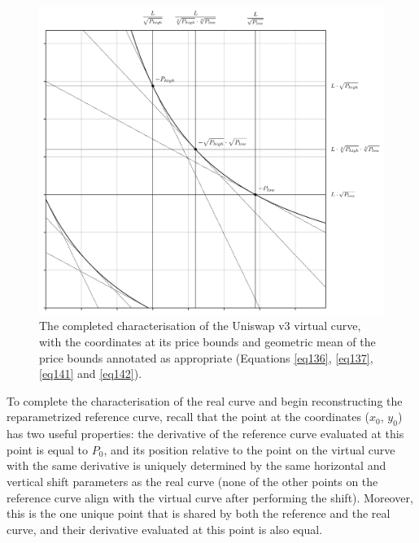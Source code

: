 \documentclass{article}
\begin{document}
\begin{figure}[ht]
    \centering
    \includegraphics[width=\textwidth]{fig27.png}
    \captionsetup{
        justification=raggedright,
        singlelinecheck=false,
        font=small,
        labelfont=bf,
        labelsep=quad,
        format=plain
    }
    \caption{The completed characterisation of the Uniswap v3 virtual curve, with the coordinates at its price bounds and geometric mean of the price bounds annotated as appropriate (Equations \ref{eq136}, \ref{eq137}, \ref{eq141} and \ref{eq142}).}
    \label{fig27}
\end{figure}

To complete the characterisation of the real curve and begin reconstructing the reparametrized reference curve, recall that the point at the coordinates ($x_{0}$, $y_{0}$) has two useful properties: the derivative of the reference curve evaluated at this point is equal to $P_{0}$, and its position relative to the point on the virtual curve with the same derivative is uniquely determined by the same horizontal and vertical shift parameters as the real curve (none of the other points on the reference curve align with the virtual curve after performing the shift). Moreover, this is the one unique point that is shared by both the reference and the real curve, and their derivative evaluated at this point is also equal. 
\end{document}
